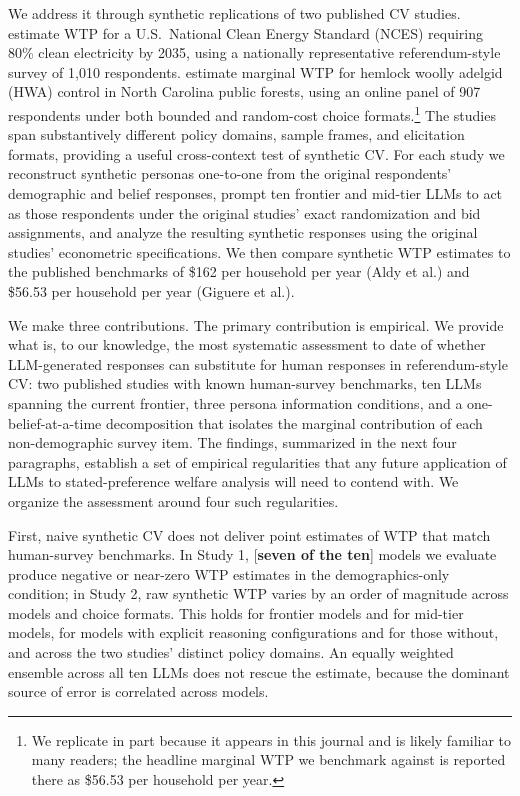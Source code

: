 \documentclass[12pt]{article}
\begin{document}
We address it through synthetic replications of two published CV studies.
\textcite{Aldy2012} estimate WTP for a U.S.\ National Clean Energy Standard
(NCES) requiring 80\% clean electricity by 2035, using a nationally
representative referendum-style survey of 1{,}010 respondents.
\textcite{Giguere2020} estimate marginal WTP for hemlock woolly adelgid
(HWA) control in North Carolina public forests, using an online panel of
907 respondents under both bounded and random-cost choice formats.\footnote{We
replicate \textcite{Giguere2020} in part because it appears in this journal
and is likely familiar to many readers; the headline marginal WTP we
benchmark against is reported there as \$56.53 per household per year.}
The studies span substantively different policy domains, sample frames, and
elicitation formats, providing a useful cross-context test of synthetic CV.
For each study we reconstruct synthetic personas one-to-one from the
original respondents' demographic and belief responses, prompt ten frontier
and mid-tier LLMs to act as those respondents under the original studies'
exact randomization and bid assignments, and analyze the resulting synthetic
responses using the original studies' econometric specifications. We then
compare synthetic WTP estimates to the published benchmarks of \$162 per
household per year (Aldy et al.) and \$56.53 per household per year (Giguere
et al.).

We make three contributions. The primary contribution is empirical. We
provide what is, to our knowledge, the most systematic assessment to date
of whether LLM-generated responses can substitute for human responses in
referendum-style CV: two published studies with known human-survey
benchmarks, ten LLMs spanning the current frontier, three persona
information conditions, and a one-belief-at-a-time decomposition that
isolates the marginal contribution of each non-demographic survey item.
The findings, summarized in the next four paragraphs, establish a set of
empirical regularities that any future application of LLMs to
stated-preference welfare analysis will need to contend with. We organize
the assessment around four such regularities.

First, naive synthetic CV does not deliver point estimates of WTP that
match human-survey benchmarks. In Study 1, [\textbf{seven of the ten}]
models we evaluate produce negative or near-zero WTP estimates in the
demographics-only condition; in Study 2, raw synthetic WTP varies by an
order of magnitude across models and choice formats. This holds for
frontier models and for mid-tier models, for models with explicit reasoning
configurations and for those without, and across the two studies' distinct
policy domains. An equally weighted ensemble across all ten LLMs does not
rescue the estimate, because the dominant source of error is correlated
across models.
\end{document}

